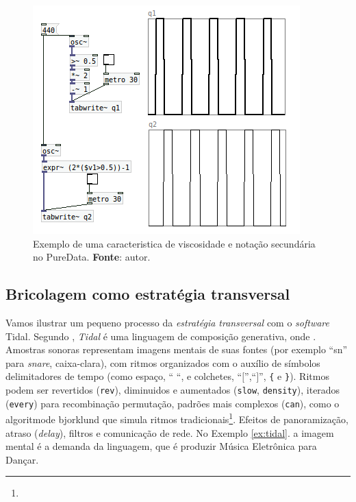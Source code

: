 \begin{figure}[!h]
  \centering
  \includegraphics[scale=0.7]{imagens/pd.png}
  \caption{Exemplo de uma caracteristica de viscosidade e notação secundária no PureData. \textbf{Fonte}: autor. }
  \label{fig:pd}
\end{figure}

 
\subsection{Bricolagem como estratégia transversal}\label{sec:tidal}

Vamos ilustrar um pequeno processo da \emph{estratégia transversal} com o \emph{software} Tidal.
Segundo , \emph{Tidal} é uma linguagem de composição generativa, onde . Amostras sonoras representam imagens mentais de suas fontes (por exemplo ``sn'' para \emph{snare}, caixa-clara), com ritmos organizados com o auxílio de símbolos delimitadores de tempo (como espaço, `` ``, e colchetes, ``$[$'',``$]$'', \verb|{| e \verb|}|). Ritmos podem ser revertidos (\verb|rev|), diminuidos e aumentados (\verb|slow|, \verb|density|), iterados (\verb|every|) para recombinação permutação, padrões mais complexos (\verb|can|), como o algoritmode bjorklund que simula ritmos tradicionais\footnote{}. Efeitos de panoramização, atraso (\emph{delay}), filtros e comunicação de rede. No Exemplo \ref{ex:tidal}. a imagem mental é a demanda da linguagem, que é produzir Música Eletrônica para Dançar.

